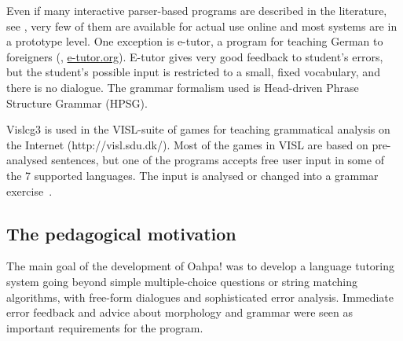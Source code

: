 \documentclass[11pt]{article}
\begin{document}
Even if many interactive parser-based programs are described in the literature, see \cite{Gamper:02,Heift:07}, very few of them are available for actual use online and most systems are in a prototype level. One exception is e-tutor, a program for teaching German to foreigners (\cite{Heift:01,Heift:02}, \url{e-tutor.org}). E-tutor gives very good feedback to student's errors, but the student's possible input is restricted to a small, fixed vocabulary, and there is no dialogue. The grammar formalism used is Head-driven Phrase Structure Grammar (HPSG).

Vislcg3 is used in the VISL-suite of games for teaching grammatical analysis on the Internet (http://visl.sdu.dk/). Most of the games in VISL are based on pre-analysed sentences, but one of the programs accepts free user input in some of the 7 supported languages. The input is analysed or changed into a grammar exercise~\cite{Bick:05}.


\subsection{The pedagogical motivation} \label{pedidea}

The main goal of the development of Oahpa! was to develop a language tutoring system going beyond simple multiple-choice questions or string matching algorithms, with free-form dialogues and sophisticated error analysis. Immediate error feedback and advice about morphology and grammar 
were seen as important requirements for the program.
\end{document}
